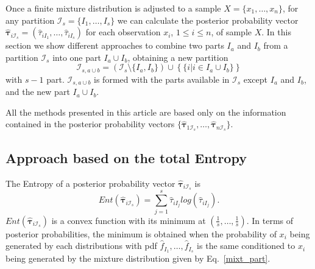 \documentclass[10pt, a4paper]{article}
\newcommand{\m}[1]{\boldsymbol{#1}}
\begin{document}
Once a finite mixture distribution is adjusted to a sample $X=\{x_1, \dots, x_n\}$, for any partition $\mathcal{I}_s = \{ I_1, \dots, I_s\}$ we can calculate the posterior probability vector  $\hat{\m\tau}_{i \mathcal{I}_s} = \left( \hat{\tau}_{i I_1} , \dots, \hat{\tau}_{i I_s}  \right)$ for each observation $x_i$, $1 \leq i \leq n$, of sample $X$. In this section we show different approaches to combine two parts $I_a$ and $I_b$ from a partition $\mathcal{I}_s$ into one part $I_a \cup I_b$, obtaining a new partition
\[
\mathcal{I}_{s, a \cup b} = \left( \mathcal{I}_s \setminus \{ I_a, I_b \} \right) \cup \left\{ \{ i | i \in I_a\cup I_b \} \right\}
\]
with $s-1$ part. $\mathcal{I}_{s, a \cup b}$ is formed with the parts available in $\mathcal{I}_{s}$ except $I_a$ and  $I_b$, and the new part $I_a \cup I_b$. 

All the methods presented in this article are based only on the information contained in the posterior probability vectors $\{ \hat{\m\tau}_{1 \mathcal{I}_s},\dots, \hat{\m\tau}_{n \mathcal{I}_s} \}$.


\subsection{Approach based on the total Entropy}




The Entropy of a posterior probability vector $\hat{\m \tau}_{i \mathcal{I}_s}$ is
\[
Ent( \hat{\m \tau}_{i \mathcal{I}_s} ) = \sum_{j=1}^s \hat{\tau}_{i I_j}  log(\hat{\tau}_{i I_j} ).
\]
$Ent( \hat{\m \tau}_{i \mathcal{I}_s} )$ is a convex function with its minimum at $(\frac{1}{s},\dots,\frac{1}{s})$. In terms of posterior probabilities, the minimum is obtained when the probability of $x_i$ being generated by each distributions with pdf $\hat{f}_{I_1}, \dots, \hat{f}_{I_s}$ is the same conditioned to $x_i$ being generated by the mixture distribution given by Eq.~\ref{mixt_part}.
\end{document}
